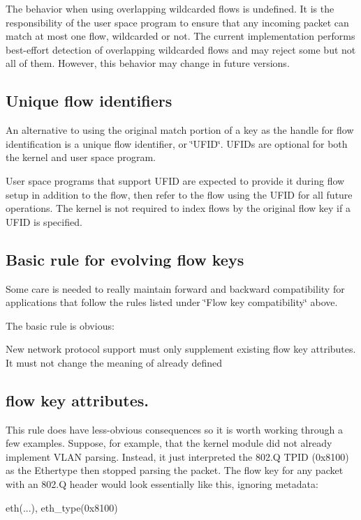 The behavior when using overlapping wildcarded flows is undefined. It is the responsibility of the user space program to ensure that any incoming packet can match at most one flow, wildcarded or not. The current implementation performs best-\/effort detection of overlapping wildcarded flows and may reject some but not all of them. However, this behavior may change in future versions.

\subsection*{Unique flow identifiers }

An alternative to using the original match portion of a key as the handle for flow identification is a unique flow identifier, or \char`\"{}\+U\+F\+I\+D\char`\"{}. U\+F\+I\+Ds are optional for both the kernel and user space program.

User space programs that support U\+F\+I\+D are expected to provide it during flow setup in addition to the flow, then refer to the flow using the U\+F\+I\+D for all future operations. The kernel is not required to index flows by the original flow key if a U\+F\+I\+D is specified.

\subsection*{Basic rule for evolving flow keys }

Some care is needed to really maintain forward and backward compatibility for applications that follow the rules listed under \char`\"{}\+Flow key compatibility\char`\"{} above.

The basic rule is obvious\+: 

 New network protocol support must only supplement existing flow key attributes. It must not change the meaning of already defined \subsection*{flow key attributes. }

This rule does have less-\/obvious consequences so it is worth working through a few examples. Suppose, for example, that the kernel module did not already implement V\+L\+A\+N parsing. Instead, it just interpreted the 802.\+Q T\+P\+I\+D (0x8100) as the Ethertype then stopped parsing the packet. The flow key for any packet with an 802.\+Q header would look essentially like this, ignoring metadata\+: \begin{DoxyVerb}eth(...), eth_type(0x8100)
\end{DoxyVerb}


